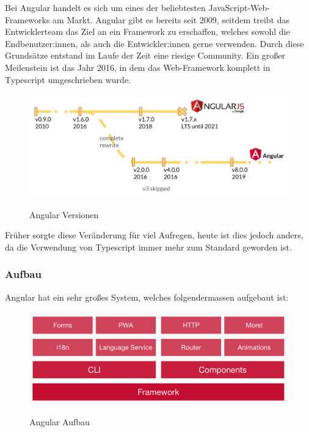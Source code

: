 Bei Angular handelt es sich um eines der beliebtesten JavaScript-Web-Frameworks am Markt. Angular gibt es bereits seit 2009, seitdem treibt das Entwicklerteam das Ziel an ein Framework zu erschaffen, welches sowohl die Endbenutzer:innen, als auch die Entwickler:innen gerne verwenden. Durch diese Grundsätze entstand im Laufe der Zeit eine riesige Community. Ein großer Meilenstein ist das Jahr 2016, in dem das Web-Framework komplett in Typescript umgeschrieben wurde.

\begin{figure}[h!]
    \centering
    \includegraphics[width=1\textwidth]{pics/angular-versions.png}
    \caption{Angular Versionen}
    \cite{frontend_web_angular_introduction}
    \label{fig:mesh1}
\end{figure}

Früher sorgte diese Veränderung für viel Aufregen, heute ist dies jedoch anders, da die Verwendung von Typescript immer mehr zum Standard geworden ist.

\subsubsection{Aufbau}
Angular hat ein sehr großes System, welches folgendermassen aufgebaut ist:

\begin{figure}[h!]
    \centering
    \includegraphics[width=1\textwidth]{pics/angular-architecture.png}
    \caption{Angular Aufbau}
    \cite{frontend_web_angular_introduction}
    \label{fig:mesh1}
\end{figure}

